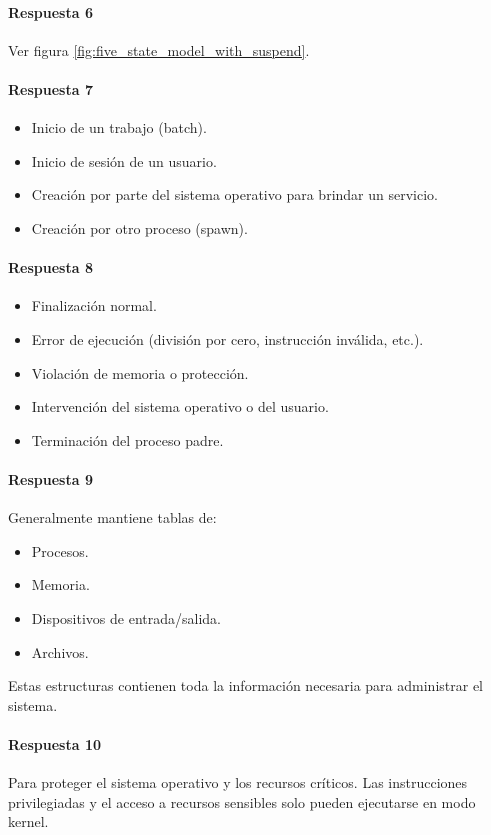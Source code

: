 \paragraph{Respuesta 6}
Ver figura \ref{fig:five_state_model_with_suspend}.

\paragraph{Respuesta 7}
\begin{itemize}
  \item Inicio de un trabajo (batch).
  \item Inicio de sesión de un usuario.
  \item Creación por parte del sistema operativo para brindar un servicio.
  \item Creación por otro proceso (spawn).
\end{itemize}

\paragraph{Respuesta 8}
\begin{itemize}
  \item Finalización normal.
  \item Error de ejecución (división por cero, instrucción inválida, etc.).
  \item Violación de memoria o protección.
  \item Intervención del sistema operativo o del usuario.
  \item Terminación del proceso padre.
\end{itemize}

\paragraph{Respuesta 9}
Generalmente mantiene tablas de:
\begin{itemize}
  \item Procesos.
  \item Memoria.
  \item Dispositivos de entrada/salida.
  \item Archivos.
\end{itemize}
Estas estructuras contienen toda la información necesaria para administrar el sistema.

\paragraph{Respuesta 10}
Para proteger el sistema operativo y los recursos críticos. Las instrucciones privilegiadas y el acceso a recursos sensibles solo pueden ejecutarse en modo kernel.


